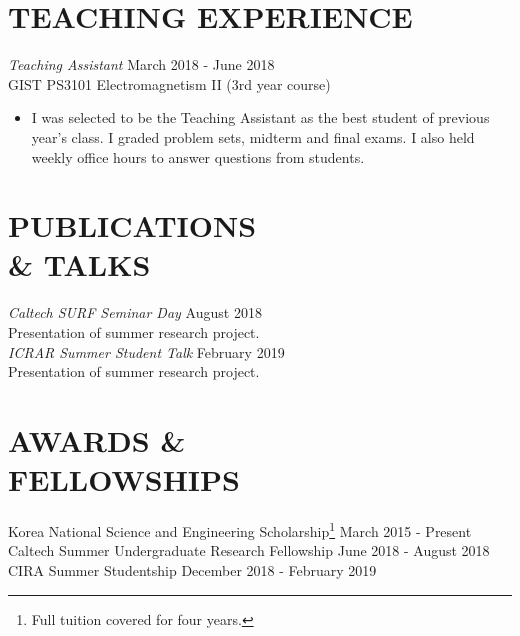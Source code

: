 \documentclass[margin, 10pt]{res} %
\begin{document}
\begin{resume}
\section{TEACHING EXPERIENCE}

{\sl Teaching Assistant} \hfill March 2018 - June 2018 \\
GIST PS3101 Electromagnetism II (3rd year course)
\begin{itemize} \itemsep -2pt %
\item[] I was selected to be the Teaching Assistant as the best student of previous year's class. I graded problem sets, midterm and final exams. I also held weekly office hours to answer questions from students.
\end{itemize}


\section{PUBLICATIONS \\ \& TALKS}

{\sl Caltech SURF Seminar Day} \hfill{August 2018}\\
Presentation of summer research project. \\
{\sl ICRAR Summer Student Talk} \hfill{February 2019}\\
Presentation of summer research project.


\section{AWARDS \& \\ FELLOWSHIPS}

Korea National Science and Engineering Scholarship\footnote{Full tuition covered for four years.} \hfill March 2015 - Present\\
Caltech Summer Undergraduate Research Fellowship \hfill June 2018 - August 2018\\
CIRA Summer Studentship \hfill December 2018 - February 2019\\



\end{resume}
\end{document}
